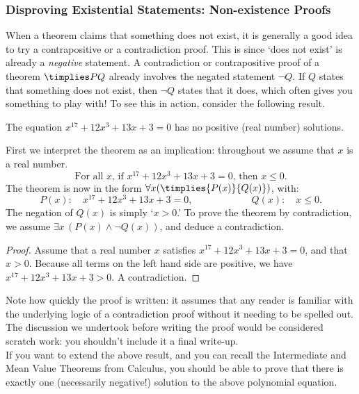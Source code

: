 \subsubsection*{Disproving Existential Statements: Non-existence Proofs}

When a theorem claims that something does not exist, it is generally a good idea to try a contrapositive or a contradiction proof. This is since `does not exist' is already a \emph{negative} statement. A contradiction or contrapositive proof of a theorem $\timplies PQ$ already involves the negated statement $\neg Q$. If $Q$ states that something does not exist, then $\neg Q$ states that it does, which often gives you something to play with! To see this in action, consider the following result.

\begin{thm}
The equation $x^{17}+12x^3+13x+3=0$ has no positive (real number) solutions.
\end{thm}

\noindent First we interpret the theorem as an implication: throughout we assume that $x$ is a real number.
\[\text{For all $x$, if $x^{17}+12x^3+13x+3=0$, then $x\leq 0$.}\]
The theorem is now in the form $\forall x (\timplies{P(x)}{Q(x)})$, with:
\[P(x):\quad x^{17}+12x^3+13x+3=0,\qquad\qquad\qquad Q(x):\quad x\le 0.\]
The negation of $Q(x)$ is simply `$x>0$.' To prove the theorem by contradiction, we assume $\exists x \, (P(x) \land \neg Q(x))$, and deduce a contradiction.


\begin{proof}
Assume that a real number $x$ satisfies $x^{17}+12x^3+13x+3=0$, and that $x>0$. Because all terms on the left hand side are positive, we have $x^{17}+12x^3+13x+3>0$. A contradiction.
\end{proof}


\noindent Note how quickly the proof is written: it assumes that any reader is familiar with the underlying logic of a contradiction proof without it needing to be spelled out. The discussion we undertook before writing the proof would be considered scratch work: you shouldn't include it a final write-up.\\

\noindent If you want to extend the above result, and you can recall the Intermediate and Mean Value Theorems from Calculus, you should be able to prove that there is exactly one (necessarily negative!) solution to the above polynomial equation.


